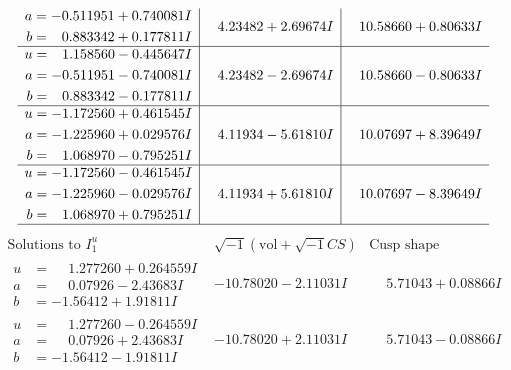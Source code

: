\documentclass[1p]{elsarticle_modified}
\theoremstyle{definition}
\newcommand{\I}{\sqrt{-1}}
\begin{document}
$$\begin{array}{c|c|c}
\begin{aligned}
a &= -0.511951 + 0.740081 I \\
b &= \phantom{-}0.883342 + 0.177811 I\end{aligned}
 & \phantom{-}4.23482 + 2.69674 I & \phantom{-}10.58660 + 0.80633 I \\ \hline\begin{aligned}
u &= \phantom{-}1.158560 - 0.445647 I \\
a &= -0.511951 - 0.740081 I \\
b &= \phantom{-}0.883342 - 0.177811 I\end{aligned}
 & \phantom{-}4.23482 - 2.69674 I & \phantom{-}10.58660 - 0.80633 I \\ \hline\begin{aligned}
u &= -1.172560 + 0.461545 I \\
a &= -1.225960 + 0.029576 I \\
b &= \phantom{-}1.068970 - 0.795251 I\end{aligned}
 & \phantom{-}4.11934 - 5.61810 I & \phantom{-}10.07697 + 8.39649 I \\ \hline\begin{aligned}
u &= -1.172560 - 0.461545 I \\
a &= -1.225960 - 0.029576 I \\
b &= \phantom{-}1.068970 + 0.795251 I\end{aligned}
 & \phantom{-}4.11934 + 5.61810 I & \phantom{-}10.07697 - 8.39649 I\\
 \hline 
 \end{array}$$\newpage$$\begin{array}{c|c|c}  
\text{Solutions to }I^u_{1}& \I (\text{vol} + \sqrt{-1}CS) & \text{Cusp shape}\\
 \hline 
\begin{aligned}
u &= \phantom{-}1.277260 + 0.264559 I \\
a &= \phantom{-}0.07926 - 2.43683 I \\
b &= -1.56412 + 1.91811 I\end{aligned}
 & -10.78020 - 2.11031 I & \phantom{-}5.71043 + 0.08866 I \\ \hline\begin{aligned}
u &= \phantom{-}1.277260 - 0.264559 I \\
a &= \phantom{-}0.07926 + 2.43683 I \\
b &= -1.56412 - 1.91811 I\end{aligned}
 & -10.78020 + 2.11031 I & \phantom{-}5.71043 - 0.08866 I \\ \hline\begin{aligned}

\end{aligned}
\end{array}$$
\end{document}
